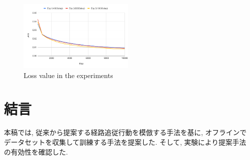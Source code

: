 \documentclass[10pt]{ujarticle}
\begin{document}
    \begin{table}[h]
        \centering
        \caption{Number of successes in the experiment}
        \label{tb:result}
      \end{table}

    \newpage
    \begin{figure}[h]
        \centering
        \includegraphics[width=0.5\textwidth]{fig/chart.png}
        \caption{Loss value in the experiments}
        \label{Fig:loss}
    \end{figure}

    \section{結\hspace{2zw}言}%
    本稿では, 従来から提案する経路追従行動を模倣する手法を基に, オフラインでデータセットを収集して訓練する手法を提案した. そして, 実験により提案手法の有効性を確認した. 
\end{document}
